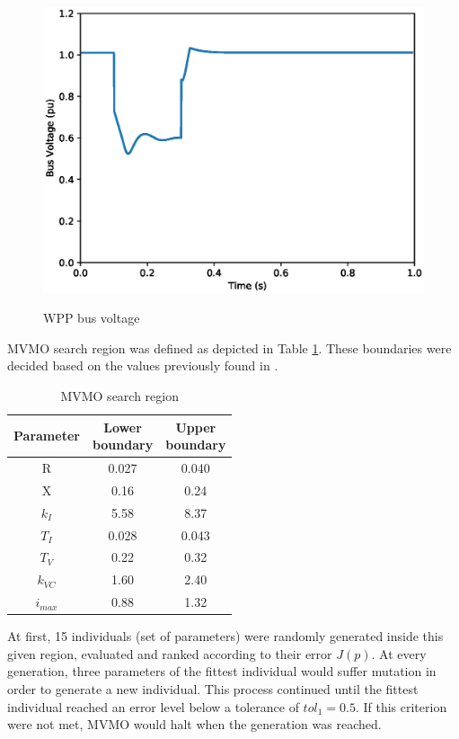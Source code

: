 \begin{figure}[!h]
	\centering
	\caption{WPP bus voltage}
	\includegraphics[scale=.7]{Images/bus_voltage.eps}
	\label{fig: WPP_voltage}
\end{figure}

MVMO search region was defined as depicted in Table \ref{tab: MVMO_boundaries}. These boundaries were decided based on the values previously found in \cite{Cari2015}.

\begin{table}[!h]
	\centering
	\caption{MVMO search region}
	\begin{tabular}{c|cc}
		Parameter & \shortstack{Lower \\ boundary} & \shortstack{Upper \\ boundary} \\\hline
		R & 0.027 & 0.040 \\
		X & 0.16 & 0.24 \\
		$k_{I}$ & 5.58 & 8.37 \\
		$T_{I}$ & 0.028 & 0.043 \\
		$T_{V}$ & 0.22 & 0.32 \\
		$k_{VC}$ & 1.60 & 2.40 \\
		$i_{max}$ & 0.88 & 1.32
	\end{tabular}
	\label{tab: MVMO_boundaries}
\end{table}

At first, 15 individuals (set of parameters) were randomly generated inside this given region, evaluated and ranked according to their error $J(p)$. At every generation, three parameters of the fittest individual would suffer mutation in order to generate a new individual. This process continued until the fittest individual reached an error level below a tolerance of $tol_{1} = 0.5$. If this criterion were not met, MVMO would halt when the  generation was reached.

